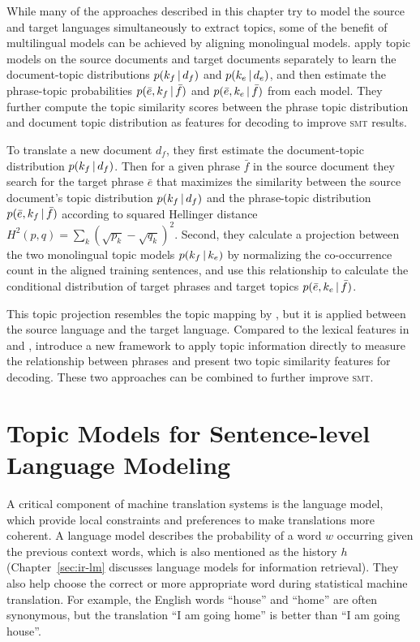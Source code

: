 While many of the approaches described in this chapter try to model the source and target
languages simultaneously to extract topics, some of the benefit of multilingual models can be achieved by aligning monolingual models. \citet{xiao-12} apply
topic models on the source documents and target documents separately
to learn the document-topic distributions $p(k_f \, | \, d_f)$ and $p(k_e \, | \,
d_e)$, and then estimate the phrase-topic probabilities $p(\bar{e}, k_f
\, | \, \bar{f})$ and $p(\bar{e}, k_e \, | \, \bar{f})$ from each model. They further
compute the topic similarity scores between the phrase topic
distribution and document topic distribution as features for decoding
to improve \textsc{smt} results.

To translate a new document $d_f$, they first estimate the document-topic distribution $p(k_f \, | \,
d_f)$.
Then for a given phrase $\bar{f}$ in the source document they search
for the target phrase $\bar{e}$ that maximizes the similarity between
the source document's topic distribution $p(k_f \, | \, d_f)$ and the
phrase-topic distribution $p(\bar{e}, k_f \, | \, \bar{f})$ according to
squared Hellinger distance $H^2(p, q) = \sum_k \left(\sqrt{p_k} - \sqrt{q_k} \right)^2$.
Second, they calculate a projection between the two monolingual topic models $p(k_f
\, | \, k_e)$  by normalizing the co-occurrence count in the aligned training
sentences, and use this relationship to calculate the conditional
distribution of target phrases and target topics $p(\bar{e}, k_e \, | \, \bar{f})$.

This topic projection resembles the topic mapping by
\citet{su-12}, but it is applied between the source language and the
target language. Compared to the lexical features in
\citet{Eidelman-12} and \citet{hu-14}, \citet{xiao-12} introduce a new
framework to apply topic information directly to measure the relationship between phrases and present two topic similarity features for decoding. These two approaches can
be combined to further improve \textsc{smt}.

\section{Topic Models for Sentence-level Language Modeling}

A critical component of machine translation systems is the language
model, which provide local constraints and preferences to make
translations more coherent. A language model describes the probability
of a word $w$ occurring given the previous context words, which is
also mentioned as the history $h$ (Chapter~\ref{sec:ir-lm} discusses
language models for information retrieval). They also help choose the
correct or more appropriate word during statistical machine
translation. For example, the English words ``house'' and ``home'' are
often synonymous, but the translation ``I am going home'' is
better than ``I am going house''.

